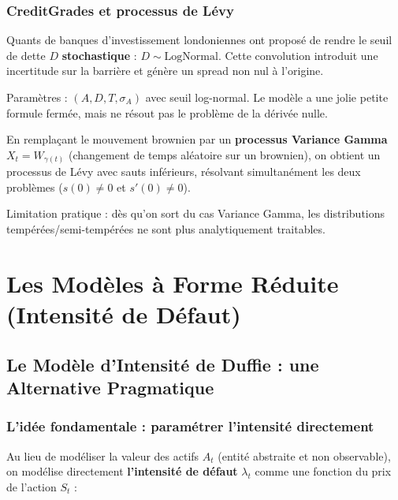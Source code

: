 \subsubsection{CreditGrades et processus de Lévy}

\begin{exemple}
Quants de banques d'investissement londoniennes ont proposé de rendre le seuil de dette $D$ \textbf{stochastique} : $D \sim \mathrm{LogNormal}$. Cette convolution introduit une incertitude sur la barrière et génère un spread non nul à l'origine.

Paramètres : $(A, D, T, \sigma_A)$ avec seuil log-normal. Le modèle a une \og jolie petite formule \fg{} fermée, mais ne résout pas le problème de la dérivée nulle.
\end{exemple}

\begin{exemple}
En remplaçant le mouvement brownien par un \textbf{processus Variance Gamma} $X_t = W_{\gamma(t)}$ (changement de temps aléatoire sur un brownien), on obtient un processus de Lévy avec sauts inférieurs, résolvant simultanément les deux problèmes ($s(0) \neq 0$ et $s'(0) \neq 0$).

Limitation pratique : dès qu'on sort du cas Variance Gamma, les distributions tempérées/semi-tempérées ne sont plus analytiquement traitables.
\end{exemple}

\section{Les Modèles à Forme Réduite (Intensité de Défaut)}

\subsection{Le Modèle d'Intensité de Duffie : une Alternative Pragmatique}

\subsubsection{L'idée fondamentale : paramétrer l'intensité directement}

Au lieu de modéliser la valeur des actifs $A_t$ (entité abstraite et non observable), on modélise directement \textbf{l'intensité de défaut} $\lambda_t$ comme une fonction du prix de l'action $S_t$ :

